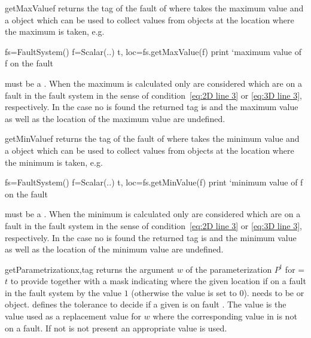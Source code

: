 \begin{methoddesc}[FaultSystem]{getMaxValue}{f}
returns the tag of the fault of where  takes the maximum value and a  object which can be used to collect values from \Data objects at the location where the maximum is taken, e.g.
\begin{python}
fs=FaultSystem()
f=Scalar(..)
t, loc=fs.getMaxValue(f)
print `maximum value of f on the fault %
\end{python}
 must be a \Scalar. When the maximum is calculated only \DataSamplePoints are considered
which are on a fault in the fault system in the sense of condition~\ref{eq:2D line 3} or \ref{eq:3D line 3}, respectively. In the case no \DataSamplePoints is found the returned tag is  and
the maximum value as well as the location of the maximum value are undefined.
\end{methoddesc}

\begin{methoddesc}[FaultSystem]{getMinValue}{f}
returns the tag of the fault of where  takes the minimum value and a  object which can be used to collect values from \Data objects at the location where the minimum is taken, e.g.
\begin{python}
fs=FaultSystem()
f=Scalar(..)
t, loc=fs.getMinValue(f)
print `minimum value of f on the fault %
\end{python}
 must be a \Scalar. When the minimum is calculated only \DataSamplePoints are considered
which are on a fault in the fault system in the sense of condition~\ref{eq:2D line 3} or \ref{eq:3D line 3}, respectively. In the case no \DataSamplePoints is found the returned tag is  and
the minimum value as well as the location of the minimum value are undefined.
\end{methoddesc}

\begin{methoddesc}[FaultSystem]{getParametrization}{x,tag }
returns the argument $w$ of the parameterization $P^t$ for =$t$ to provide 
together with a mask indicating where the given location if on a fault in the fault system by the value $1$ (otherwise the value is set to $0$).  needs to be \Vector or \numpyNDA object.  defines the tolerance to decide if a given \DataSamplePoints is on fault . The value
 is the value used as a replacement value for $w$ where the corresponding value in  is not 
on a fault. If not  is not present an appropriate value is used.
\end{methoddesc}
 
